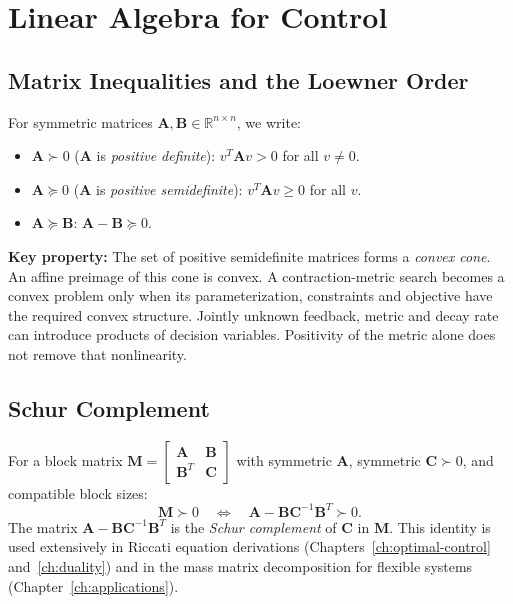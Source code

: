 \documentclass[10pt,letterpaper,openany]{book}
\theoremstyle{plain}
\theoremstyle{definition}
\theoremstyle{remark}
\renewcommand{\R}{\mathbb{R}}
\renewcommand{\mat}[1]{\mathbf{#1}}
\begin{document}
\chapter{Linear Algebra for Control}
\label{app:linalg}

\section{Matrix Inequalities and the Loewner Order}

For symmetric matrices $\mat{A}, \mat{B} \in \R^{n \times n}$, we write:
\begin{itemize}
\item $\mat{A} \succ 0$ ($\mat{A}$ is \emph{positive definite}): $v^T\mat{A}v > 0$ for all $v \neq 0$.
\item $\mat{A} \succeq 0$ ($\mat{A}$ is \emph{positive semidefinite}): $v^T\mat{A}v \geq 0$ for all $v$.
\item $\mat{A} \succeq \mat{B}$: $\mat{A} - \mat{B} \succeq 0$.
\end{itemize}

\textbf{Key property:} The set of positive semidefinite matrices forms a \emph{convex cone}.
An affine preimage of this cone is convex. A contraction-metric search becomes
a convex problem only when its parameterization, constraints and objective have
the required convex structure. Jointly unknown feedback, metric and decay rate
can introduce products of decision variables. Positivity of the metric alone
does not remove that nonlinearity.

\section{Schur Complement}

For a block matrix $\mat{M} = \begin{bmatrix} \mat{A} & \mat{B} \\ \mat{B}^T & \mat{C} \end{bmatrix}$
with symmetric $\mat A$, symmetric $\mat C\succ0$, and compatible block sizes:
\begin{equation}
\mat{M} \succ 0 \quad \Leftrightarrow \quad \mat{A} - \mat{B}\mat{C}^{-1}\mat{B}^T \succ 0.
\end{equation}
The matrix $\mat{A} - \mat{B}\mat{C}^{-1}\mat{B}^T$ is the \emph{Schur complement} of $\mat{C}$
in $\mat{M}$. This identity is used extensively in Riccati equation derivations
(Chapters~\ref{ch:optimal-control} and~\ref{ch:duality}) and in the mass matrix decomposition
for flexible systems (Chapter~\ref{ch:applications}).
\end{document}
